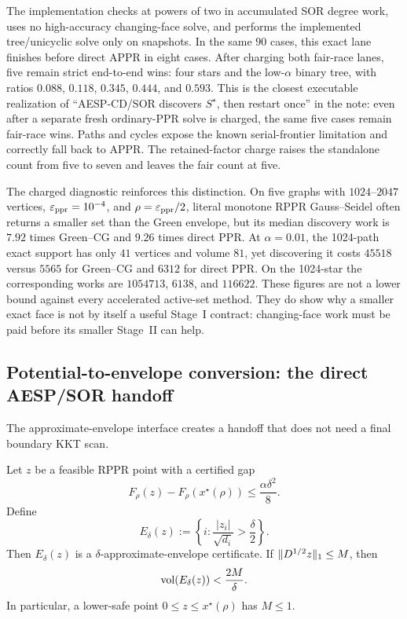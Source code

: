 The implementation checks at powers of two in accumulated SOR degree work,
uses no high-accuracy changing-face solve, and performs the implemented
tree/unicyclic solve only on snapshots.  In the same $90$ cases, this exact
lane finishes before direct APPR in eight cases.  After charging both
fair-race lanes, five remain strict end-to-end wins: four stars and the
low-$\alpha$ binary tree, with ratios $0.088$, $0.118$, $0.345$, $0.444$,
and $0.593$.  This is the
closest executable realization of ``AESP-CD/SOR discovers $S^\star$, then
restart once'' in the note: even after a separate fresh ordinary-PPR solve is
charged, the same five cases remain fair-race wins.  Paths and cycles expose the known serial-frontier
limitation and correctly fall back to APPR.
The retained-factor charge raises the standalone count from five to seven and
leaves the fair count at five.

The charged diagnostic reinforces this distinction.  On five graphs with
$1024$--$2047$ vertices, $\varepsilon_{\mathrm{ppr}}=10^{-4}$, and
$\rho=\varepsilon_{\mathrm{ppr}}/2$, literal monotone RPPR Gauss--Seidel often returns a smaller
set than the Green envelope, but its median discovery work is $7.92$ times
Green--CG and $9.26$ times direct PPR.  At $\alpha=0.01$, the 1024-path exact
support has only $41$ vertices and volume $81$, yet discovering it costs
$45518$ versus $5565$ for Green--CG and $6312$ for direct PPR.  On the
1024-star the corresponding works are $1054713$, $6138$, and $116622$.
These figures are not a lower bound against every accelerated active-set
method.  They do show why a smaller exact face is not by itself a useful
Stage~I contract: changing-face work must be paid before its smaller Stage~II
can help.

\subsection{Potential-to-envelope conversion: the direct AESP/SOR handoff}

The approximate-envelope interface creates a handoff that does not need a
final boundary KKT scan.

\begin{proposition}
\label{prop:two-stage-gap-to-envelope}
Let $z$ be a feasible RPPR point with a certified gap
\begin{equation}
 F_\rho(z)-F_\rho(x^\star(\rho))
 \leq\frac{\alpha\delta^2}{8}.
 \label{eq:two-stage-gap-certificate}
\end{equation}
Define
\begin{equation}
 E_\delta(z):=
 \left\{i:\frac{|z_i|}{\sqrt{d_i}}>\frac\delta2\right\}.
 \label{eq:two-stage-threshold-envelope}
\end{equation}
Then $E_\delta(z)$ is a $\delta$-approximate-envelope certificate.  If
$\lVert D^{1/2}z\rVert_1\leq M$, then
\begin{equation}
 \operatorname{vol}(E_\delta(z))<\frac{2M}{\delta}.
 \label{eq:two-stage-threshold-envelope-volume}
\end{equation}
In particular, a lower-safe point $0\leq z\leq x^\star(\rho)$ has $M\leq1$.
\end{proposition}

